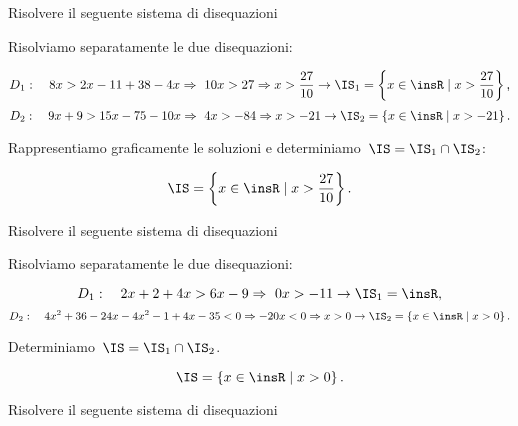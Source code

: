 \begin{exrig}
 \begin{esempio}
Risolvere il seguente sistema di disequazioni

Risolviamo separatamente le due disequazioni:

\[D_{1}:\quad 8x>2x-11+38-4x\Rightarrow~10x>27\Rightarrow x>\frac{27}{10}\rightarrow\IS_{1}=\left\{x\in\insR\mid x>\frac{27}{10}\right\}\text{,}\]
\[D_{2}:\quad 9x+9>15x-75-10x\Rightarrow~4x>-84\Rightarrow x>-21\rightarrow \IS_{2}=\left\{x\in\insR\mid x>-21\right\}.\]

Rappresentiamo graficamente le soluzioni e determiniamo~$\IS=\IS_{1}\cap \IS_{2}$:
\begin{center}

\end{center}
\[\IS=\left\{x\in\insR\mid x>\frac{27}{10}\right\}.\]
 \end{esempio}

 \begin{esempio}
 Risolvere il seguente sistema di disequazioni

Risolviamo separatamente le due disequazioni:

\[D_{1}:\quad 2x+2+4x>6x-9\Rightarrow~0x>-11\rightarrow\IS_{1}=\insR,\]
\[D_{2}:\quad 4x^{2}+36-24x-4x^{2}-1+4x-35<0\Rightarrow -20x<0\Rightarrow x>0\rightarrow\IS_{2}=\left\{x\in \insR\mid x>0\right\}.\]

Determiniamo~$\IS=\IS_{1}\cap \IS_{2}$.
\begin{center}

\end{center}
 \[\IS=\left\{x\in \insR\mid x>0\right\}.\]
 \end{esempio}

 \begin{esempio}
 Risolvere il seguente sistema di disequazioni


\end{esempio}
\end{exrig}
